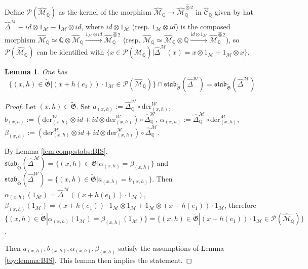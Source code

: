 \documentclass[10pt]{amsart}
\newtheorem{lem}[thm]{Lemma}
\numberwithin{equation}{subsection}
\begin{document}
Define $\mathcal P(\hat{\mathcal M}_{\mathbb Q})$ as the kernel of the morphism $\hat{\mathcal M}_{\mathbb Q}
\to \hat{\mathcal M}_{\mathbb Q}^{\hat\otimes2}$ in $\hat{\mathcal C}_{\mathbb Q}$ 
given by hat $\hat\Delta^{\mathcal M}-id \otimes 1_{\mathcal M}-1_{\mathcal M}\otimes id$, where $id \otimes 1_{\mathcal M}$ 
(resp. $1_{\mathcal M}\otimes id$) is the composed morphism 
$\hat{\mathcal M}_{\mathbb Q} \simeq \mathbb Q\otimes \hat{\mathcal M}_{\mathbb Q}
\stackrel{1_{\mathcal M}\otimes id}{\to}\hat{\mathcal M}_{\mathbb Q}^{\hat\otimes2}$ 
(resp. $\hat{\mathcal M}_{\mathbb Q} \simeq \hat{\mathcal M}_{\mathbb Q}\otimes\mathbb Q 
\stackrel{id\otimes 1_{\mathcal M}}{\to}\hat{\mathcal M}_{\mathbb Q}^{\hat\otimes2}$), so  
$\mathcal P(\hat{\mathcal M}_{\mathbb Q})$ can be identified with $\{x\in \mathcal P(\hat{\mathcal M}_{\mathbb Q})|
\hat\Delta^{\mathcal M}(x)=x\otimes 1_{\mathcal M}+1_{\mathcal M}\otimes x\}$. 

\begin{lem}\label{lem:3:11:3105:BIS}
One has 
$$
\{(x,h)\in \tilde{\mathfrak G}|(x+h(e_1))\cdot 1_{\mathcal M}
\in\mathcal P(\hat{\mathcal M}_{\mathbb Q})\}\cap \mathfrak{stab}_{\tilde{\mathfrak G}}(\hat\Delta^{\mathcal W})=
\mathfrak{stab}_{\tilde{\mathfrak G}}(\hat\Delta^{\mathcal M})
$$
\end{lem}

\begin{proof} Let $(x,h)\in \tilde{\mathfrak G}$. Set $a_{(x,h)}:=\hat\Delta^{\mathcal W}_{\mathbb Q}\circ\mathrm{der}^{\mathcal W}_{(x,h)}$, 
$b_{(x,h)}:=(\mathrm{der}^{\mathcal W}_{(x,h)}\otimes id+id\otimes \mathrm{der}^{\mathcal W}_{(x,h)})\circ
\hat\Delta^{\mathcal W}_{\mathbb Q}$,
$\alpha_{(x,h)}:=\hat\Delta^{\mathcal M}_{\mathbb Q}\circ\mathrm{der}^{\mathcal M}_{(x,h)}$, 
$\beta_{(x,h)}:=(\mathrm{der}^{\mathcal M}_{(x,h)}\otimes id+id\otimes \mathrm{der}^{\mathcal M}_{(x,h)})\circ
\hat\Delta^{\mathcal M}_{\mathbb Q}$.

By Lemma \ref{lem:comp:stabs:BIS}, 
$\mathfrak{stab}_{\tilde{\mathfrak G}}(\hat\Delta^{\mathcal M})=\{(x,h)\in\tilde{\mathfrak G}|\alpha_{(x,h)}=\beta_{(x,h)}\}$ and 
$\mathfrak{stab}_{\tilde{\mathfrak G}}(\hat\Delta^{\mathcal W})=\{(x,h)\in\tilde{\mathfrak G}|a_{(x,h)}=b_{(x,h)}\}$. Then 
$\alpha_{(x,h)}(1_{\mathcal M})=\hat\Delta^{\mathcal M}((x+h(e_1))\cdot 1_{\mathcal M})$, $\beta_{(x,h)}(1_{\mathcal M})=
(x+h(e_1))\cdot 1_{\mathcal M}\otimes 1_{\mathcal M}+1_{\mathcal M}\otimes (x+h(e_1))\cdot 1_{\mathcal M}$, therefore 
$\{(x,h)\in\tilde{\mathfrak G}|\alpha_{(x,h)}(1_{\mathcal M})=\beta_{(x,h)}(1_{\mathcal M})\}
=\{(x,h)\in\tilde{\mathfrak G}|(x+h(e_1))\cdot 1_{\mathcal M}\in\mathcal P(\hat{\mathcal M}_{\mathbb Q})\}$. 

Then $a_{(x,h)},b_{(x,h)},\alpha_{(x,h)},\beta_{(x,h)}$ satisfy the assumptions of Lemma \ref{toy:lemma:BIS}. This lemma then implies the 
statement. 
\end{proof}
\end{document}
